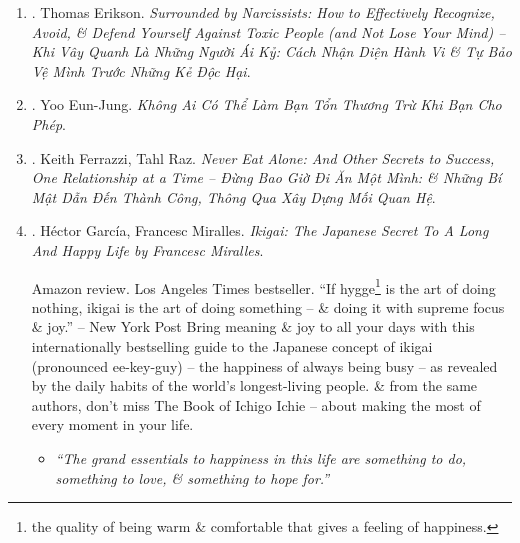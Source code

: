 \documentclass{article}
\begin{document}
\begin{enumerate}
	{\sf Amazon review.} From the Sunday Times bestselling author of {\it Surrounded by Idiots}

	Are you overshadowed by narcissists in your life? Are you worn out by their constant demands for attention, their absolute belief they are right (even when clearly they are not), their determination to do what they want (regardless of impact), \& their baffling need to control everyone \& everything around them?

	In this thought-provoking, sanity-saving book, {\sc Thomas Erikson} helps you understand what makes narcissists tick, \& crucially, how to handle them without wearing yourself out in process. With help of behavioral model made famous in {\it Surrounded by Idiots}, {\sc Erikson} provides all tools you need to manage not just narcissists around you but everyday narcissism as well -- itself becoming more widespread in this age of social media. Engaging \& practical, {\it Surrounded by Narcissists} will help you free yourself from narcissistic agendas so you can pursue a happier, more fulfilling \& successful life.

	\item \cite{Erikson_narcisisst_VN}. {\sc Thomas Erikson}. {\it Surrounded by Narcissists: How to Effectively Recognize, Avoid, \& Defend Yourself Against Toxic People (and Not Lose Your Mind) -- Khi Vây Quanh Là Những Người Ái Kỷ: Cách Nhận Diện Hành Vi \& Tự Bảo Vệ Mình Trước Những Kẻ Độc Hại}.\hfill{\sf[finished]}

	\item \cite{Eun-Jung_hurt_VN}. Yoo Eun-Jung. {\it Không Ai Có Thể Làm Bạn Tổn Thương Trừ Khi Bạn Cho Phép}.\hfill{\sf[done]}
	
	\item \cite{Ferrazzi_Raz_never_eat_alone_VN}. {\sc Keith Ferrazzi, Tahl Raz}. {\it Never Eat Alone: And Other Secrets to Success, One Relationship at a Time -- Đừng Bao Giờ Đi Ăn Một Mình: \& Những Bí Mật Dẫn Đến Thành Công, Thông Qua Xây Dựng Mối Quan Hệ}.\hfill{\sf[done]}

	\item \cite{Garcia_Miralles_ikigai}. {\sc H\'ector Garc\'ia, Francesc Miralles}. {\it Ikigai: The Japanese Secret To A Long And Happy Life by Francesc Miralles}. {}

	{\sf Amazon review.} Los Angeles Times bestseller. ``If hygge\footnote{the quality of being warm \& comfortable that gives a feeling of happiness.} is the art of doing nothing, ikigai is the art of doing something -- \& doing it with supreme focus \& joy.'' -- New York Post Bring meaning \& joy to all your days with this internationally bestselling guide to the Japanese concept of ikigai (pronounced ee-key-guy) -- the happiness of always being busy -- as revealed by the daily habits of the world's longest-living people. \& from the same authors, don't miss The Book of Ichigo Ichie -- about making the most of every moment in your life.
	\begin{itemize}
		\item {\it``The grand essentials to happiness in this life are something to do, something to love, \& something to hope for.''}


\end{itemize}
\end{enumerate}
\end{document}
